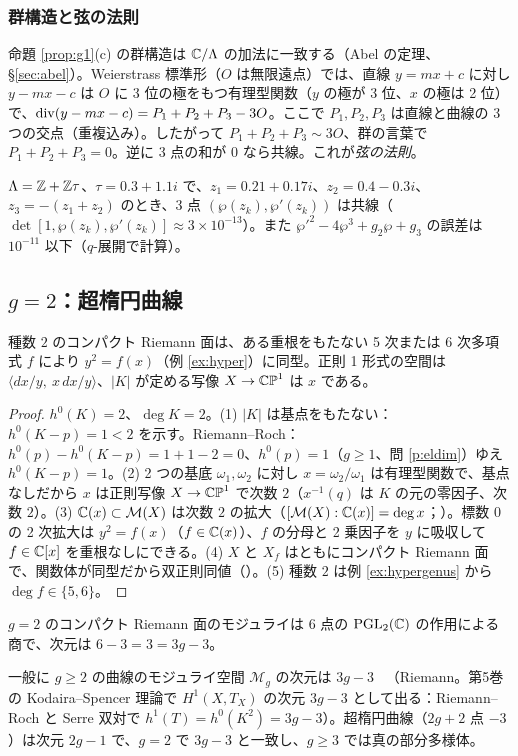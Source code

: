 \subsubsection*{群構造と弦の法則}
命題 \ref{prop:g1}(c) の群構造は $\mathbb C/\Lambda$ の加法に一致する（Abel の定理、\S\ref{sec:abel}）。Weierstrass 標準形（$O$ は無限遠点）では、直線 $y=mx+c$ に対し $y-mx-c$ は $O$ に 3 位の極をもつ有理型関数（$y$ の極が 3 位、$x$ の極は 2 位）で、$\operatorname{div}(y-mx-c)=P_1+P_2+P_3-3O$。ここで $P_1,P_2,P_3$ は直線と曲線の 3 つの交点（重複込み）。したがって $P_1+P_2+P_3\sim3O$、群の言葉で $P_1+P_2+P_3=0$。逆に 3 点の和が $0$ なら共線。これが\emph{弦の法則}。
\begin{ex}[数値的確認]\label{ex:chord}
$\Lambda=\mathbb Z+\mathbb Z\tau$、$\tau=0.3+1.1i$ で、$z_1=0.21+0.17i$、$z_2=0.4-0.3i$、$z_3=-(z_1+z_2)$ のとき、$3$ 点 $(\wp(z_k),\wp'(z_k))$ は共線（$\det[1,\wp(z_k),\wp'(z_k)]\approx3\times10^{-13}$）。また $\wp'^2-4\wp^3+g_2\wp+g_3$ の誤差は $10^{-11}$ 以下（$q$-展開で計算）。
\end{ex}

\subsection{$g=2$：超楕円曲線}
\begin{thm}\label{thm:g2}
種数 $2$ のコンパクト Riemann 面は、ある重根をもたない 5 次または 6 次多項式 $f$ により $y^2=f(x)$（例 \ref{ex:hyper}）に同型。正則 1 形式の空間は $\langle dx/y,\ x\,dx/y\rangle$、$|K|$ が定める写像 $X\to\mathbb{CP}^1$ は $x$ である。
\end{thm}
\begin{proof}
$h^0(K)=2$、$\deg K=2$。(1) $|K|$ は基点をもたない：$h^0(K-p)=1<2$ を示す。Riemann--Roch：$h^0(p)-h^0(K-p)=1+1-2=0$、$h^0(p)=1$（$g\ge1$、問 \ref{p:eldim}）ゆえ $h^0(K-p)=1$。(2) 2 つの基底 $\omega_1,\omega_2$ に対し $x=\omega_2/\omega_1$ は有理型関数で、基点なしだから $x$ は正則写像 $X\to\mathbb{CP}^1$ で次数 $2$（$x^{-1}(q)$ は $K$ の元の零因子、次数 $2$）。(3) $\mathbb C(x)\subset\mathcal M(X)$ は次数 $2$ の拡大（$[\mathcal M(X):\mathbb C(x)]=\deg x$；\tC）。標数 $0$ の 2 次拡大は $y^2=f(x)$（$f\in\mathbb C(x)$）、$f$ の分母と 2 乗因子を $y$ に吸収して $f\in\mathbb C[x]$ を重根なしにできる。(4) $X$ と $X_f$ はともにコンパクト Riemann 面で、関数体が同型だから双正則同値（\tC）。(5) 種数 $2$ は例 \ref{ex:hypergenus} から $\deg f\in\{5,6\}$。 
\end{proof}
\begin{cor}
$g=2$ のコンパクト Riemann 面のモジュライは $6$ 点の $\mathrm{PGL}_2(\mathbb C)$ の作用による商で、次元は $6-3=3=3g-3$。
\end{cor}
一般に $g\ge2$ の曲線のモジュライ空間 $\mathcal M_g$ の次元は $3g-3$ \tC\ （Riemann。第5巻の Kodaira--Spencer 理論で $H^1(X,T_X)$ の次元 $3g-3$ として出る：Riemann--Roch と Serre 双対で $h^1(T)=h^0(K^2)=3g-3$）。超楕円曲線（$2g+2$ 点 $-3$）は次元 $2g-1$ で、$g=2$ で $3g-3$ と一致し、$g\ge3$ では真の部分多様体。

